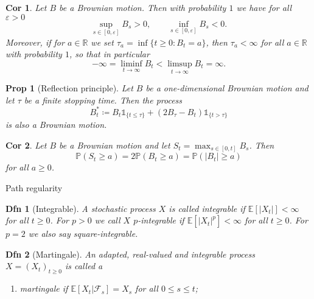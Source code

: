 \documentclass[a4paper]{article}
\theoremstyle{mytheoremstyle}
\newtheorem{definition}{Dfn}
\newtheorem{proposition}{Prop}
\newtheorem{corollary}{Cor}[theorem]
\newcommand{\1}{\mathds{1}}
\begin{document}
\begin{multicols*}{3}
\begin{unlabeledbox}
\begin{corollary}
  \label{cor:Bm up and down}Let $B$ be a Brownian motion. Then with
  probability $1$ we have for all $\varepsilon > 0$
  \vspace{-0.5em}
  \[
    \sup_{s \in [0, \varepsilon]} B_s > 0, \qquad \inf_{s \in [0,
     \varepsilon]} B_s < 0. \]
  Moreover, if for $a \in \mathbb{R}$ we set $\tau_a = \inf \{t \geqslant 0 :
  B_t = a\}$, then $\tau_a < \infty$ for all $a \in \mathbb{R}$ with
  probability $1$, so that in particular
  \vspace{-1em}
  \begin{equation}
    - \infty = \liminf_{t \rightarrow \infty} B_t < \limsup_{t \rightarrow
    \infty} B_t = \infty . \label{eq:Bm.up.and.down}
  \end{equation}
\end{corollary}

\begin{proposition}[Reflection principle]
  Let $B$ be a one-dimensional Brownian motion and let $\tau$ be a finite
  stopping time. Then the process
  \vspace{-0.5em}
  \[ B^{*}_t \coloneq B_t \1_{\{ t \leqslant \tau \}} + (2 B_{\tau}
     - B_t) \1_{\{ t > \tau \}} \]
  \vspace{-0.5em}
  is also a Brownian motion.
\end{proposition}

\begin{corollary}
  Let $B$ be a Brownian motion and let $S_t = \max_{s \in [0, t]} B_s$. Then
  \vspace{-0.5em}
  \[ \mathbb{P} (S_t \geqslant a) = 2\mathbb{P} (B_t \geqslant a) =\mathbb{P}
     (| B_t | \geqslant a) \]
  \vspace{-0.5em}
  for all $a \geqslant 0$.
\end{corollary}
\end{unlabeledbox}

\begin{roundbox}{Path regularity}
\begin{definition}[Integrable]
  A stochastic process $X$ is called {\emph{integrable}} if $\mathbb{E} [|X_t
  |] < \infty$ for all $t \geqslant 0$. For $p > 0$ we call $X$
  {\emph{$p$-integrable}} if $\mathbb{E} [|X_t |^p] < \infty$ for all $t
  \geqslant 0$. For $p = 2$ we also say {\emph{square-integrable}}.
\end{definition}

\begin{definition}[Martingale]
  An adapted, real-valued and integrable process $X = (X_t)_{t \geqslant 0}$
  is called a
  \begin{enumerate}[parsep=0.2em]
    \item {\emph{martingale}} if $\mathbb{E} [X_t |\mathcal{F}_s] = X_s$ for
    all $0 \leqslant s \leqslant t$;
    

\end{enumerate}
\end{definition}
\end{roundbox}
\end{multicols*}
\end{document}
